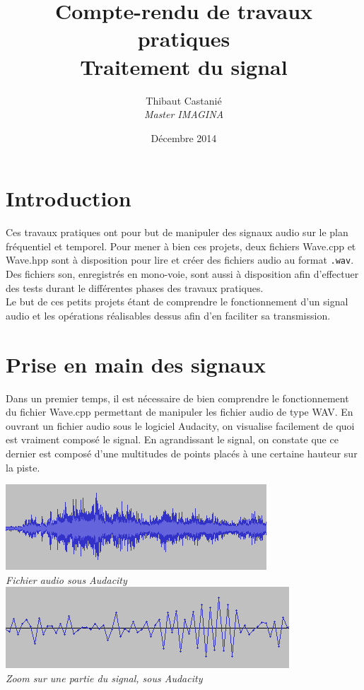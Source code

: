 \documentclass[a4paper,11pt]{article}
\begin{document}
\title{\textbf{Compte-rendu de travaux pratiques}\\Traitement du signal}
\author{Thibaut Castanié\\\textit{Master IMAGINA}}
\date{Décembre 2014}

\maketitle

\thispagestyle{empty}

\newpage 
\section*{Introduction}
Ces travaux pratiques ont pour but de manipuler des signaux audio sur le plan fréquentiel et temporel. Pour mener à bien ces projets, deux fichiers Wave.cpp et Wave.hpp sont à disposition pour lire et créer des fichiers audio au format \texttt{.wav}. Des fichiers son, enregistrés en mono-voie, sont aussi à disposition afin d'effectuer des tests durant le différentes phases des travaux pratiques.\\
Le but de ces petits projets étant de comprendre le fonctionnement d'un signal audio et les opérations réalisables dessus afin d'en faciliter sa transmission.
\newpage 
\section{Prise en main des signaux}
Dans un premier temps, il est nécessaire de bien comprendre le fonctionnement du fichier Wave.cpp permettant de manipuler les fichier audio de type WAV. En ouvrant un fichier audio sous le logiciel Audacity, on visualise facilement de quoi est vraiment composé le signal. En agrandissant le signal, on constate que ce dernier est composé d'une multitudes de points placés à une certaine hauteur sur la piste.

\begin{center}
\includegraphics[scale=1]{zoom1.png}\\
\textit{Fichier audio sous Audacity}
\includegraphics[scale=1]{zoom2.png}\\
\textit{Zoom sur une partie du signal, sous Audacity}
\end{center}
\end{document}
